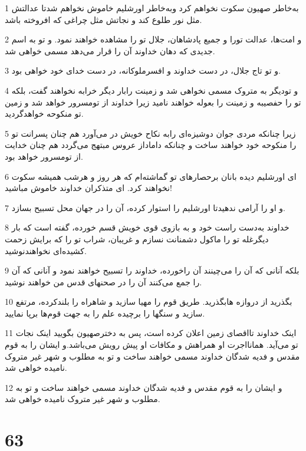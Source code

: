 \par 1 به‌خاطر صهیون سکوت نخواهم کرد وبه‌خاطر اورشلیم خاموش نخواهم شدتا عدالتش مثل نور طلوع کند و نجاتش مثل چراغی که افروخته باشد.
\par 2 و امت‌ها، عدالت تورا و جمیع پادشاهان، جلال تو را مشاهده خواهند نمود. و تو به اسم جدیدی که دهان خداوند آن را قرار می‌دهد مسمی خواهی شد.
\par 3 و تو تاج جلال، در دست خداوند و افسرملوکانه، در دست خدای خود خواهی بود. 
\par 4 و تودیگر به متروک مسمی نخواهی شد و زمینت رابار دیگر خرابه نخواهند گفت، بلکه تو را حفصیبه و زمینت را بعوله خواهند نامید زیرا خداوند از تومسرور خواهد شد و زمین تو منکوحه خواهدگردید.
\par 5 زیرا چنانکه مردی جوان دوشیزه‌ای رابه نکاح خویش در می‌آورد هم چنان پسرانت تو را منکوحه خود خواهند ساخت و چنانکه داماداز عروس مبتهج می‌گردد هم چنان خدایت از تومسرور خواهد بود.
\par 6 ‌ای اورشلیم دیده بانان برحصارهای تو گماشته‌ام که هر روز و هرشب همیشه سکوت نخواهند کرد. ای متذکران خداوند خاموش مباشید!
\par 7 و او را آرامی ندهیدتا اورشلیم را استوار کرده، آن را در جهان محل تسبیح بسازد.
\par 8 خداوند به‌دست راست خود و به بازوی قوی خویش قسم خورده، گفته است که بار دیگرغله تو را ماکول دشمنانت نسازم و غریبان، شراب تو را که برایش زحمت کشیده‌ای نخواهندنوشید.
\par 9 بلکه آنانی که آن را می‌چینند آن راخورده، خداوند را تسبیح خواهند نمود و آنانی که آن را جمع می‌کنند آن را در صحنهای قدس من خواهند نوشید.
\par 10 بگذرید از دروازه هابگذرید. طریق قوم را مهیا سازید و شاهراه را بلندکرده، مرتفع سازید و سنگها را برچیده علم را به جهت قوم‌ها برپا نمایید.
\par 11 اینک خداوند تااقصای زمین اعلان کرده است، پس به دخترصهیون بگویید اینک نجات تو می‌آید. همانااجرت او همراهش و مکافات او پیش رویش می‌باشد.و ایشان را به قوم مقدس و فدیه شدگان خداوند مسمی خواهند ساخت و تو به مطلوب و شهر غیر متروک نامیده خواهی شد.
\par 12 و ایشان را به قوم مقدس و فدیه شدگان خداوند مسمی خواهند ساخت و تو به مطلوب و شهر غیر متروک نامیده خواهی شد.
 
\chapter{63}

